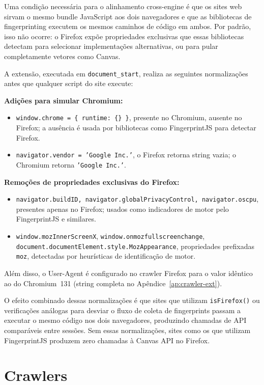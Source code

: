 Uma condição necessária para o alinhamento cross-engine é que os sites web sirvam
o mesmo bundle JavaScript aos dois navegadores e que as bibliotecas de
fingerprinting executem os mesmos caminhos de código em ambos. Por padrão,
isso não ocorre: o Firefox expõe propriedades exclusivas que essas bibliotecas
detectam para selecionar implementações alternativas, ou para pular
completamente vetores como Canvas.

A extensão, executada em \texttt{document\_start}, realiza as seguintes
normalizações antes que qualquer script do site execute:

\textbf{Adições para simular Chromium:}
\begin{itemize}
  \item \texttt{window.chrome = \{ runtime: \{\} \}}, presente no Chromium,
    ausente no Firefox; a ausência é usada por bibliotecas como FingerprintJS para
    detectar Firefox.
  \item \texttt{navigator.vendor = 'Google Inc.'}, o Firefox retorna string
    vazia; o Chromium retorna \texttt{'Google Inc.'}.
\end{itemize}

\textbf{Remoções de propriedades exclusivas do Firefox:}
\begin{itemize}
  \item \texttt{navigator.buildID, navigator.globalPrivacyControl, navigator.oscpu}, presentes apenas no Firefox; usados como
    indicadores de motor pelo FingerprintJS e similares.
  \item \texttt{window.mozInnerScreenX}, \texttt{window.onmozfullscreenchange},
    \texttt{document.documentElement.style.MozAppearance}, propriedades
    prefixadas \texttt{moz}, detectadas por heurísticas de identificação de motor.
\end{itemize}

Além disso, o User-Agent é configurado no crawler Firefox para o valor
idêntico ao do Chromium~131 (string completa no Apêndice~\ref{ap:crawler-ext}).

O efeito combinado dessas normalizações é que sites que utilizam
\texttt{isFirefox()} ou verificações análogas para desviar o fluxo de coleta de
fingerprints passam a executar o mesmo código nos dois navegadores,
produzindo chamadas de API comparáveis entre sessões. Sem essas normalizações,
sites como os que utilizam FingerprintJS produzem zero chamadas à Canvas API no
Firefox.

\section{Crawlers}
\label{sec:crawlers}

